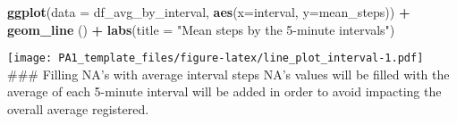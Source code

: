 \documentclass[
]{article}
\newenvironment{Shaded}{\begin{snugshade}}{\end{snugshade}}
\newcommand{\AttributeTok}[1]{\textcolor[rgb]{0.13,0.29,0.53}{#1}}
\newcommand{\ConstantTok}[1]{\textcolor[rgb]{0.56,0.35,0.01}{#1}}
\newcommand{\ControlFlowTok}[1]{\textcolor[rgb]{0.13,0.29,0.53}{\textbf{#1}}}
\newcommand{\DecValTok}[1]{\textcolor[rgb]{0.00,0.00,0.81}{#1}}
\newcommand{\FunctionTok}[1]{\textcolor[rgb]{0.13,0.29,0.53}{\textbf{#1}}}
\newcommand{\NormalTok}[1]{#1}
\newcommand{\OtherTok}[1]{\textcolor[rgb]{0.56,0.35,0.01}{#1}}
\newcommand{\SpecialCharTok}[1]{\textcolor[rgb]{0.81,0.36,0.00}{\textbf{#1}}}
\newcommand{\StringTok}[1]{\textcolor[rgb]{0.31,0.60,0.02}{#1}}
\begin{document}
\begin{Shaded}
\begin{Highlighting}[]
\FunctionTok{ggplot}\NormalTok{(}\AttributeTok{data =}\NormalTok{ df\_avg\_by\_interval, }\FunctionTok{aes}\NormalTok{(}\AttributeTok{x=}\NormalTok{interval, }\AttributeTok{y=}\NormalTok{mean\_steps)) }\SpecialCharTok{+}
  \FunctionTok{geom\_line}\NormalTok{ () }\SpecialCharTok{+}
  \FunctionTok{labs}\NormalTok{(}\AttributeTok{title =} \StringTok{"Mean steps by the 5{-}minute intervals"}\NormalTok{)}
\end{Highlighting}
\end{Shaded}

\texttt{[image: PA1\_template\_files/figure-latex/line\_plot\_interval-1.pdf]}
\#\#\# Filling NA's with average interval steps NA's values will be
filled with the average of each 5-minute interval will be added in order
to avoid impacting the overall average registered.

\begin{Shaded}
\end{Shaded}

\begin{Shaded}
\end{Shaded}
\end{document}
